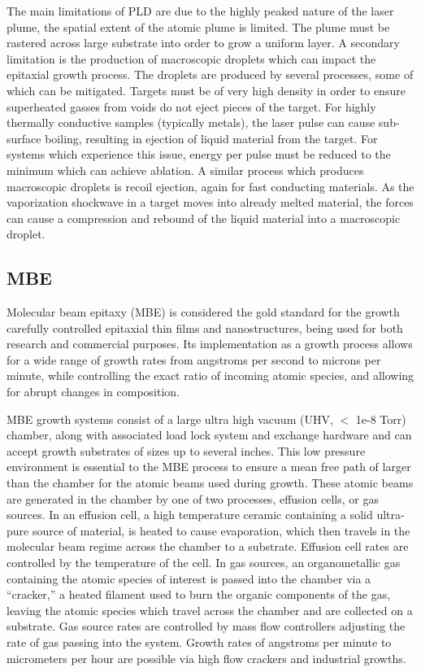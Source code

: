 The main limitations of PLD are due to the highly peaked nature of the laser plume, the spatial extent of the atomic plume is limited.
The plume must be rastered across large substrate into order to grow a uniform layer.
A secondary limitation is the production of macroscopic droplets which can impact the epitaxial growth process.
The droplets are produced by several processes, some of which can be mitigated.
Targets must be of very high density in order to ensure superheated gasses from voids do not eject pieces of the target.
For highly thermally conductive samples (typically metals), the laser pulse can cause sub-surface boiling, resulting in ejection of liquid material from the target.
For systems which experience this issue, energy per pulse must be reduced to the minimum which can achieve ablation.
A similar process which produces macroscopic droplets is recoil ejection, again for fast conducting materials.
As the vaporization shockwave in a target moves into already melted material, the forces can cause a compression and rebound of the liquid material into a macroscopic droplet.

\subsection{MBE} Molecular beam epitaxy (MBE) is considered the gold standard for the growth carefully controlled epitaxial thin films and nanostructures, being used for both research and commercial purposes.
Its implementation as a growth process allows for a wide range of growth rates from angstroms per second to microns per minute, while controlling the exact ratio of incoming atomic species, and allowing for abrupt changes in composition.

MBE growth systems consist of a large ultra high vacuum (UHV, \(<\) 1e-8 Torr) chamber, along with associated load lock system and exchange hardware and can accept growth substrates of sizes up to several inches.
This low pressure environment is essential to the MBE process to ensure a mean free path of larger than the chamber for the atomic beams used during growth.
These atomic beams are generated in the chamber by one of two processes, effusion cells, or gas sources.
In an effusion cell, a high temperature ceramic containing a solid ultra-pure source of material, is heated to cause evaporation, which then travels in the molecular beam regime across the chamber to a substrate.
Effusion cell rates are controlled by the temperature of the cell.
In gas sources, an organometallic gas containing the atomic species of interest is passed into the chamber via a ``cracker,'' a heated filament used to burn the organic components of the gas, leaving the atomic species which travel across the chamber and are collected on a substrate.
Gas source rates are controlled by mass flow controllers adjusting the rate of gas passing into the system.
Growth rates of angstroms per minute to micrometers per hour are possible via high flow crackers and industrial growths.

